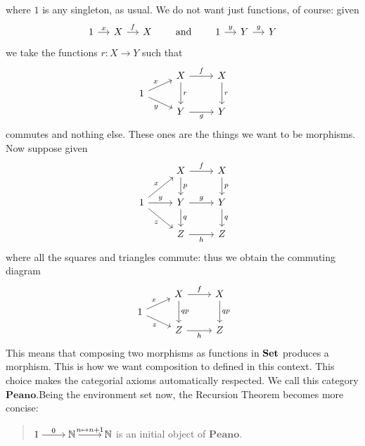 \begin{example}[Recursion]
\[\begin{tikzcd}[column sep=small]
    \end{tikzcd}
  \]
  where \(1\) is any singleton, as usual.
  We do not want just functions, of course: given
  \[
    \begin{tikzcd}[column sep=small]
      1 \ar["{x}", r] & X \ar["{f}", r] & X
    \end{tikzcd}
    \qquad\text{and}\qquad
    \begin{tikzcd}[column sep=small]
      1 \ar["{y}", r] & Y \ar["{g}", r] & Y
    \end{tikzcd}
  \]
  we take the functions \(r : X \to Y\) such that
  \[
    \begin{tikzcd}[row sep=tiny]
      & X \ar["f", r] \ar["r", dd] & X \ar["r", dd] \\
      1 \ar["x", ur] \ar["y", dr, swap] \\
      & Y \ar["g", r, swap] & Y
    \end{tikzcd}
  \]
  commutes and nothing else. These ones are the things we want to be
  morphisms. Now suppose given
  \[
    \begin{tikzcd}
      & X \ar["f", r] \ar["p", d] & X \ar["p", d] \\
      1 \ar["x", ur] \ar["y", r] \ar["z", dr, swap] & Y \ar["g", r] \ar["q", d] & Y \ar["q", d] \\
      & Z \ar["h", r, swap] & Z
    \end{tikzcd}
  \]
  where all the squares and triangles commute: thus we
  obtain the commuting diagram
  \[
    \begin{tikzcd}[row sep=tiny]
      & X \ar["f", r] \ar["qp", dd] & X \ar["qp", dd] \\
      1 \ar["x", ur] \ar["z", dr, swap] \\
      & Z \ar["h", r, swap] & Z
    \end{tikzcd}
  \]
  This means that composing two morphisms as functions
  in \(\mathbf{Set}\) produces a morphism. This is how we want composition to
  defined in this context. This choice makes the categorial axioms
  automatically respected. We call this category
  \(\mathbf{Peano}\).\newline Being the environment set now, the Recursion Theorem
  becomes more concise:
  \begin{quotation}
    \(\begin{tikzcd}[cramped] 1 \ar["{0}", r] &
      \naturals \ar["{n \mapsto n+1}", r] & \naturals \end{tikzcd}\) is an
    initial object of \(\mathbf{Peano}\).
  \end{quotation}
\end{example}

